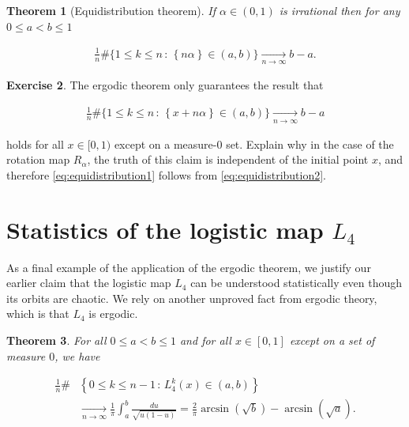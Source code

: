 \documentclass[11pt]{report}
\theoremstyle{plain}
\newtheorem{thm}{Theorem}[chapter]
\theoremstyle{definition}
\newtheorem{xexercise}[thm]{Exercise}
\begin{document}
\begin{thm}[Equidistribution theorem]
If $\alpha\in(0,1)$ is irrational then for any
$0\le a<b\le 1$

\begin{equation*} \tag{37}\label{eq:equidistribution1}
\begin{split}
\frac{1}{n} \#\Big\{ 1\le k \le n \,:\, \left\{n\alpha\right\} \in (a,b) \Big\} \xrightarrow[n\to\infty]{} b-a.
\end{split}
\end{equation*}

\end{thm}

\begin{xexercise}
The ergodic theorem only guarantees the result that

\begin{equation*} \tag{38}\label{eq:equidistribution2}
\begin{split}
\frac{1}{n} \#\Big\{ 1\le k \le n \,:\, \left\{x+n\alpha\right\} \in (a,b) \Big\} \xrightarrow[n\to\infty]{} b-a
\end{split}
\end{equation*}

\noindent holds for all $x\in [0,1)$ except on a measure-0 set.
Explain why in the case of the rotation map
$R_\alpha$, the truth of this claim is independent of
the initial point $x$, and therefore
\eqref{eq:equidistribution1} follows from
\eqref{eq:equidistribution2}.
\end{xexercise}

\section{Statistics of the logistic map $L_4$}

As a final example of the application of the ergodic
theorem, we justify our earlier claim that the
logistic map $L_4$ can be understood statistically
even though its orbits are chaotic. We rely on another
unproved fact from ergodic theory, which is that $L_4$
is ergodic.

\begin{thm}
For all $0\le a<b\le 1$ and for all $x\in[0,1]$ except
on a set of measure $0$, we have

\begin{align*}
\frac{1}{n}\# &\left\{ 0\le k\le n-1\,:\, L_4^k(x) \in (a,b) \right\} \\
& \xrightarrow[n\to\infty]{} \frac{1}{\pi} \int_a^b \frac{du}{\sqrt{u(1-u)}}
= \frac{2}{\pi}\arcsin(\sqrt{b})-\arcsin(\sqrt{a}).
\end{align*}

\end{thm}
\end{document}
